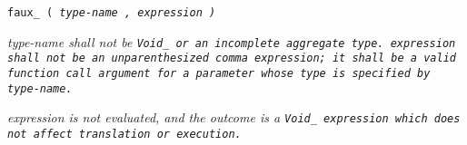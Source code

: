 
\tt{faux_ (} \it{type-name} \tt{,} \it{expression} \tt{)}


\it{type-name}  shall not be \tt{Void_} or an incomplete aggregate type.
\it{expression} shall not be an unparenthesized comma expression;
it shall be a valid function call argument for a
parameter whose type is specified by \it{type-name}.


\it{expression} is not evaluated, and the outcome is a \tt{Void_}
expression which does not affect translation or execution.
